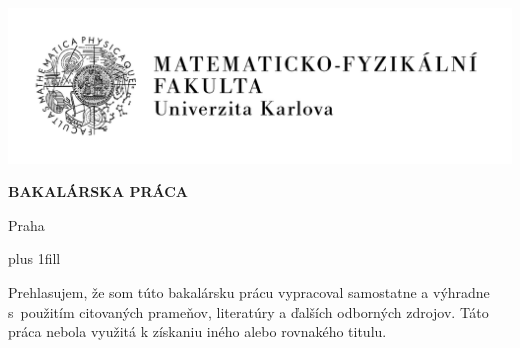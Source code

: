 

\pagestyle{empty}
\hypersetup{pageanchor=false}

\begin{center}

\centerline{\mbox{\includegraphics[width=166mm]{logo.pdf}}}

\vspace{-8mm}
\vfill

{\bf\Large BAKALÁRSKA PRÁCA}

\vfill

{\LARGE\AutorPrace}

\vspace{15mm}

{\LARGE\bfseries\NazevPrace}

\vfill

\Katedra

\vfill

{
\centerline{\vbox{}}}

\vfill

Praha \RokOdevzdani

\end{center}

\newpage



\openright
\hypersetup{pageanchor=true}
\pagestyle{plain}
\vglue 0pt plus 1fill

\noindent
Prehlasujem, že som túto bakalársku prácu vypracoval samostatne a výhradne
s~použitím citovaných prameňov, literatúry a ďalších odborných zdrojov.
Táto práca nebola využitá k získaniu iného alebo rovnakého titulu.

